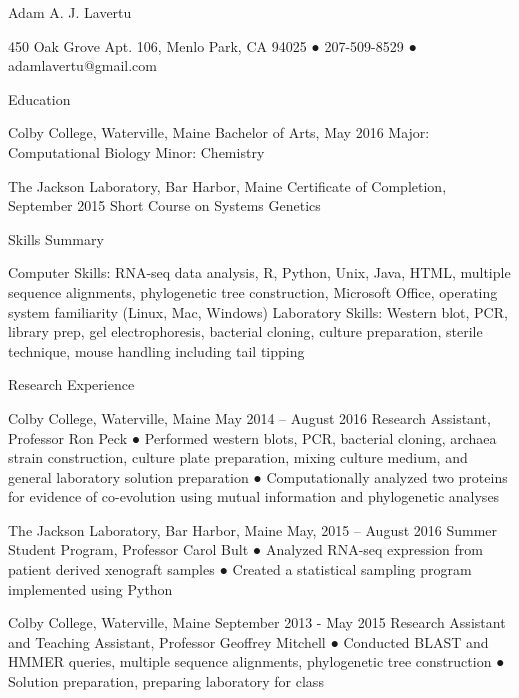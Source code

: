 \documentclass{article}
\begin{document}
	Adam A. J. Lavertu
	
	450 Oak Grove Apt. 106, Menlo Park, CA 94025 ● 207-509-8529 ● adamlavertu@gmail.com
	
	
	Education
	
	Colby College, Waterville, Maine                                                                                                                  Bachelor of Arts, May 2016
	Major: Computational Biology Minor: Chemistry                                                      
	
	The Jackson Laboratory, Bar Harbor, Maine				             Certificate of Completion, September 2015
	Short Course on Systems Genetics					                                          
	
	Skills Summary
	
	Computer Skills: RNA-seq data analysis, R, Python, Unix, Java, HTML, multiple sequence alignments, 
	phylogenetic tree construction, Microsoft Office, operating system familiarity (Linux, Mac, Windows)
	Laboratory Skills: Western blot, PCR, library prep, gel electrophoresis, bacterial cloning, 
	culture preparation, sterile technique, mouse handling including tail tipping 
	
	Research Experience
	
	Colby College, Waterville, Maine                                                                                                                       May 2014 – August 2016
	Research Assistant, Professor Ron Peck
	● Performed western blots, PCR, bacterial cloning, archaea strain construction, culture plate preparation, 
	mixing culture medium, and general laboratory solution preparation
	● Computationally analyzed two proteins for evidence of co-evolution using mutual information and phylogenetic analyses
	
	The Jackson Laboratory, Bar Harbor, Maine					                            May, 2015 – August 2016
	Summer Student Program, Professor Carol Bult
	● Analyzed RNA-seq expression from patient derived xenograft samples
	● Created a statistical sampling program implemented using Python
	
	Colby College, Waterville, Maine                                                                                                                 September 2013 - May 2015
	Research Assistant and Teaching Assistant, Professor Geoffrey Mitchell        
	● Conducted BLAST and HMMER queries, multiple sequence alignments, phylogenetic tree construction
	● Solution preparation, preparing laboratory for class
	
\end{document}
